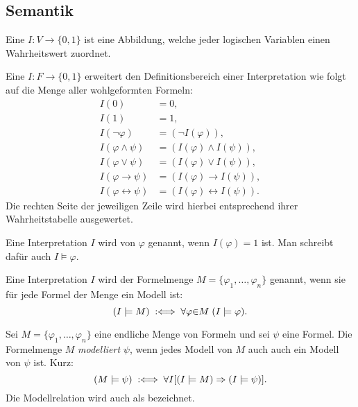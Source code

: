 \subsection{Semantik}
\begin{definition}%
\label{def:Interpretation}\mbox{}\newline
Eine 
$I\colon V\to\{0,1\}$ ist eine Abbildung,
welche jeder logischen Variablen einen Wahrheitswert zuordnet.

Eine  $I\colon F\to\{0,1\}$ erweitert den
Definitionsbereich einer Interpretation wie folgt auf die
Menge aller wohlgeformten Formeln:
\begin{align}
I(0) &= 0,\\
I(1) &= 1,\\
I(\neg\varphi) &= (\neg I(\varphi)),\\
I(\varphi\land\psi) &= (I(\varphi)\land I(\psi)),\\
I(\varphi\lor\psi) &= (I(\varphi)\lor I(\psi)),\\
I(\varphi\rightarrow\psi) &= (I(\varphi)\rightarrow I(\psi)),\\
I(\varphi\leftrightarrow\psi) &= (I(\varphi)\leftrightarrow I(\psi)).
\end{align}
Die rechten Seite der jeweiligen Zeile wird hierbei entsprechend
ihrer Wahrheitstabelle ausgewertet.
\end{definition}

\begin{definition}[Modell]\mbox{}\newline
Eine Interpretation $I$ wird 
von $\varphi$ genannt, wenn $I(\varphi)=1$ ist. Man schreibt
dafür auch $I\models\varphi$.

Eine Interpretation $I$ wird  der Formelmenge
$M=\{\varphi_1,\ldots,\varphi_n\}$ genannt, wenn sie für jede
Formel der Menge ein Modell ist:
\begin{equation}
(I\models M) \;:\Longleftrightarrow\; \forall\varphi{\in}M\;(I\models\varphi).
\end{equation}
\end{definition}

\begin{definition}[Modellrelation]\mbox{}\newline
Sei $M=\{\varphi_1,\ldots,\varphi_n\}$ eine endliche Menge
von Formeln und sei $\psi$ eine Formel. Die Formelmenge $M$
\emph{modelliert} $\psi$, wenn jedes Modell
von $M$ auch auch ein Modell von $\psi$ ist. Kurz:
\begin{equation}\label{eq:semantische-Implikation}
(M\models\psi) \;:\Longleftrightarrow\; \forall I[(I\models M)\Rightarrow (I\models\psi)].
\end{equation}
Die Modellrelation wird auch als  bezeichnet.
\end{definition}


